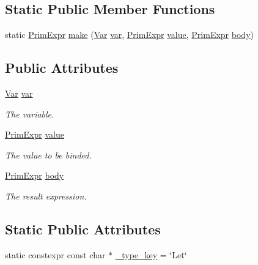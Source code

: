 \subsection*{Static Public Member Functions}
\begin{DoxyCompactItemize}
\item 
static \hyperlink{classtvm_1_1PrimExpr}{Prim\+Expr} \hyperlink{classtvm_1_1tir_1_1LetNode_a8932026cb45fa9c4f6c299d7154d4651}{make} (\hyperlink{classtvm_1_1tir_1_1Var}{Var} \hyperlink{classtvm_1_1tir_1_1LetNode_a21fdb9beb794933ee1094774ddfd2ee2}{var}, \hyperlink{classtvm_1_1PrimExpr}{Prim\+Expr} \hyperlink{classtvm_1_1tir_1_1LetNode_a6284cce4e601ca740b528f8f60aad0f9}{value}, \hyperlink{classtvm_1_1PrimExpr}{Prim\+Expr} \hyperlink{classtvm_1_1tir_1_1LetNode_af5149b73b3b94ec379fcf879cc149338}{body})
\end{DoxyCompactItemize}
\subsection*{Public Attributes}
\begin{DoxyCompactItemize}
\item 
\hyperlink{classtvm_1_1tir_1_1Var}{Var} \hyperlink{classtvm_1_1tir_1_1LetNode_a21fdb9beb794933ee1094774ddfd2ee2}{var}
\begin{DoxyCompactList}\small\item\em The variable. \end{DoxyCompactList}\item 
\hyperlink{classtvm_1_1PrimExpr}{Prim\+Expr} \hyperlink{classtvm_1_1tir_1_1LetNode_a6284cce4e601ca740b528f8f60aad0f9}{value}
\begin{DoxyCompactList}\small\item\em The value to be binded. \end{DoxyCompactList}\item 
\hyperlink{classtvm_1_1PrimExpr}{Prim\+Expr} \hyperlink{classtvm_1_1tir_1_1LetNode_af5149b73b3b94ec379fcf879cc149338}{body}
\begin{DoxyCompactList}\small\item\em The result expression. \end{DoxyCompactList}\end{DoxyCompactItemize}
\subsection*{Static Public Attributes}
\begin{DoxyCompactItemize}
\item 
static constexpr const char $\ast$ \hyperlink{classtvm_1_1tir_1_1LetNode_a2f99e4a1bdf0c7832e9184a0746298b7}{\+\_\+type\+\_\+key} = \char`\"{}Let\char`\"{}
\end{DoxyCompactItemize}


